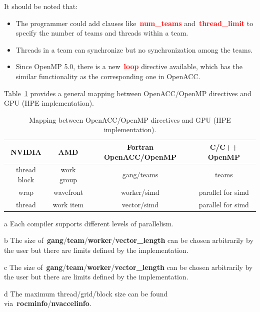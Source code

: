 \par
It should be noted that:
\begin{itemize}
    \item The programmer could add clauses like~\textbf{\textcolor{red}{num\_teams}} and~\textbf{\textcolor{red}{thread\_limit}} to specify the number of teams and threads within a team.
    \item Threads in a team can synchronize but no synchronization among the teams.
    \item Since OpenMP 5.0, there is a new~\textbf{\textcolor{red}{loop}} directive available, which has the similar functionality as the corresponding one in OpenACC.
\end{itemize}


\par
Table~\ref{tbl:openacc_openmp_directive} provides a general mapping between OpenACC/OpenMP directives and GPU (HPE implementation).


\begin{table}
\centering\caption{Mapping between OpenACC/OpenMP directives and GPU (HPE implementation).}\label{tbl:openacc_openmp_directive}
\begin{tabular}{ |c|c|c|c| } 
\hline
\textbf{NVIDIA} & \textbf{AMD} & \textbf{Fortran OpenACC/OpenMP} & \textbf{C/C++ OpenMP} \\
\hline
thread block & work group & gang/teams & teams \\ 
wrap & wavefront & worker/simd & parallel for simd \\
thread & work item & vector/simd & parallel for simd\\
\hline
\end{tabular}
\begin{tablenotes}
\footnotesize
    \item[a] Each compiler supports different levels of parallelism.
    \item[b] The size of~\textbf{gang}/\textbf{team}/\textbf{worker}/\textbf{vector\_length} can be chosen arbitrarily by the user but there are limits defined by the implementation.
    \item[c] The size of~\textbf{gang}/\textbf{team}/\textbf{worker}/\textbf{vector\_length} can be chosen arbitrarily by the user but there are limits defined by the implementation.
    \item[d] The maximum thread/grid/block size can be found via~\textbf{rocminfo}/\textbf{nvaccelinfo}.
\end{tablenotes}
\end{table}



